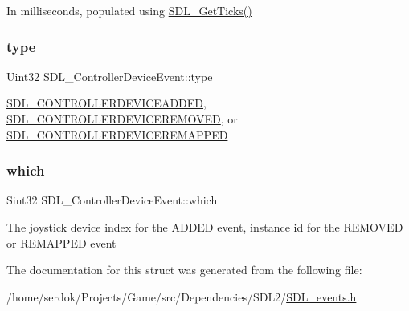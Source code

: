 In milliseconds, populated using \hyperlink{SDL__timer_8h_a0b9bc71d6287e0ffafdc3419760fe2b3}{S\+D\+L\+\_\+\+Get\+Ticks()} \mbox{\label{structSDL__ControllerDeviceEvent_a45b3807eaf70a5f5cf712455da277536}} 
\subsubsection{\texorpdfstring{type}{type}}
{\footnotesize\ttfamily Uint32 S\+D\+L\+\_\+\+Controller\+Device\+Event\+::type}

\hyperlink{SDL__events_8h_a3b589e89be6b35c02e0dd34a55f3fccaa9642de478348da1aba4fb5791e8c5314}{S\+D\+L\+\_\+\+C\+O\+N\+T\+R\+O\+L\+L\+E\+R\+D\+E\+V\+I\+C\+E\+A\+D\+D\+ED}, \hyperlink{SDL__events_8h_a3b589e89be6b35c02e0dd34a55f3fccaae00ac6995dfb7b92bfae68b9f47ae07a}{S\+D\+L\+\_\+\+C\+O\+N\+T\+R\+O\+L\+L\+E\+R\+D\+E\+V\+I\+C\+E\+R\+E\+M\+O\+V\+ED}, or \hyperlink{SDL__events_8h_a3b589e89be6b35c02e0dd34a55f3fccaaeca87c7b5bb21915d444298449a78ee6}{S\+D\+L\+\_\+\+C\+O\+N\+T\+R\+O\+L\+L\+E\+R\+D\+E\+V\+I\+C\+E\+R\+E\+M\+A\+P\+P\+ED} \mbox{\label{structSDL__ControllerDeviceEvent_accb80de1619c1e790cffb6c888c915db}} 
\subsubsection{\texorpdfstring{which}{which}}
{\footnotesize\ttfamily Sint32 S\+D\+L\+\_\+\+Controller\+Device\+Event\+::which}

The joystick device index for the A\+D\+D\+ED event, instance id for the R\+E\+M\+O\+V\+ED or R\+E\+M\+A\+P\+P\+ED event 

The documentation for this struct was generated from the following file\+:\begin{DoxyCompactItemize}
\item 
/home/serdok/\+Projects/\+Game/src/\+Dependencies/\+S\+D\+L2/\hyperlink{SDL__events_8h}{S\+D\+L\+\_\+events.\+h}\end{DoxyCompactItemize}
